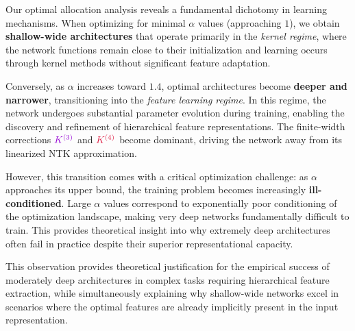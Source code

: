 \documentclass[a4paper]{article}
\theoremstyle{plain}
\theoremstyle{definition}
\theoremstyle{remark}
\begin{document}
\begin{tcolorbox}[colback=purple!10,colframe=purple!60!black,title={\textbf{🔍 FEATURE LEARNING PERSPECTIVE: Deep-Narrow vs Shallow-Wide Trade-offs}},enhanced,drop shadow]
Our optimal allocation analysis reveals a fundamental dichotomy in learning mechanisms. When optimizing for minimal $\alpha$ values (approaching $1$), we obtain \textbf{shallow-wide architectures} that operate primarily in the \textit{kernel regime}, where the network functions remain close to their initialization and learning occurs through kernel methods without significant feature adaptation.

Conversely, as $\alpha$ increases toward $1.4$, optimal architectures become \textbf{deeper and narrower}, transitioning into the \textit{feature learning regime}. In this regime, the network undergoes substantial parameter evolution during training, enabling the discovery and refinement of hierarchical feature representations. The finite-width corrections $\textcolor{k3color}{K^{(3)}}$ and $\textcolor{kernelcolor}{K^{(4)}}$ become dominant, driving the network away from its linearized NTK approximation.

However, this transition comes with a critical optimization challenge: as $\alpha$ approaches its upper bound, the training problem becomes increasingly \textbf{ill-conditioned}. Large $\alpha$ values correspond to exponentially poor conditioning of the optimization landscape, making very deep networks fundamentally difficult to train. This provides theoretical insight into why extremely deep architectures often fail in practice despite their superior representational capacity.

This observation provides theoretical justification for the empirical success of moderately deep architectures in complex tasks requiring hierarchical feature extraction, while simultaneously explaining why shallow-wide networks excel in scenarios where the optimal features are already implicitly present in the input representation.
\end{tcolorbox}
\end{document}
